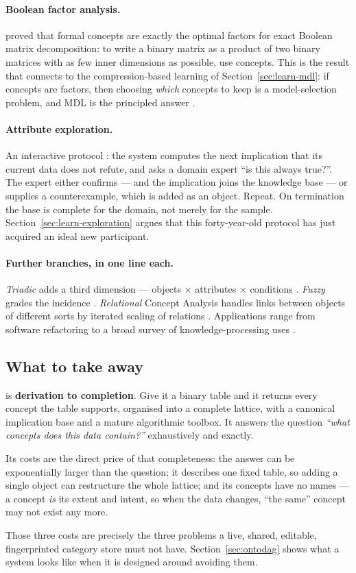 \paragraph{Boolean factor analysis.} \citet{belohlavek2010} proved that formal
concepts are exactly the optimal factors for exact Boolean matrix
decomposition: to write a binary matrix as a product of two binary matrices
with as few inner dimensions as possible, use concepts. This is the result
that connects \fca{} to the compression-based learning of
Section~\ref{sec:learn-mdl}: if concepts are factors, then choosing
\emph{which} concepts to keep is a model-selection problem, and MDL is the
principled answer \citep{miettinen2014,mdlfca}.

\paragraph{Attribute exploration.} An interactive protocol
\citep{ganter2016}: the system computes the next implication that its current
data does not refute, and asks a domain expert ``is this always true?''. The
expert either confirms --- and the implication joins the knowledge base --- or
supplies a counterexample, which is added as an object. Repeat. On
termination the base is complete for the domain, not merely for the sample.
Section~\ref{sec:learn-exploration} argues that this forty-year-old protocol
has just acquired an ideal new participant.

\paragraph{Further branches, in one line each.} \emph{Triadic} \fca{} adds a
third dimension --- objects $\times$ attributes $\times$ conditions
\citep{lehmann1995}. \emph{Fuzzy} \fca{} grades the incidence
\citep{belohlavek2004}. \emph{Relational} Concept Analysis handles links
between objects of different sorts by iterated scaling of relations
\citep{rouanehacene2013}. Applications range from software refactoring
\citep{snelting2000} to a broad survey of knowledge-processing uses
\citep{poelmans2013}.

\subsection{What to take away}

\begin{keyidea}
\fca{} is \textbf{derivation to completion}. Give it a binary table and it
returns every concept the table supports, organised into a complete lattice,
with a canonical implication base and a mature algorithmic toolbox. It answers
the question \emph{``what concepts does this data contain?''} exhaustively and
exactly.

Its costs are the direct price of that completeness: the answer can be
exponentially larger than the question; it describes one fixed table, so
adding a single object can restructure the whole lattice; and its concepts
have no names --- a concept \emph{is} its extent and intent, so when the data
changes, ``the same'' concept may not exist any more.
\end{keyidea}

Those three costs are precisely the three problems a live, shared, editable,
fingerprinted category store must not have. Section~\ref{sec:ontodag} shows
what a system looks like when it is designed around avoiding them.
